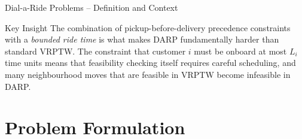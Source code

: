 \documentclass[aspectratio=169,10pt]{beamer}
\begin{document}
\begin{frame}[allowframebreaks]{Dial-a-Ride Problems – Definition and Context}
  \begin{alertblock}{Key Insight}
    The combination of pickup-before-delivery precedence constraints with a
    \emph{bounded ride time} is what makes DARP fundamentally harder than
    standard VRPTW.  The constraint that customer $i$ must be onboard at most
    $L_i$ time units means that feasibility checking itself requires careful
    scheduling, and many neighbourhood moves that are feasible in VRPTW become
    infeasible in DARP.
  \end{alertblock}

\end{frame}

\section{Problem Formulation}
\end{document}
